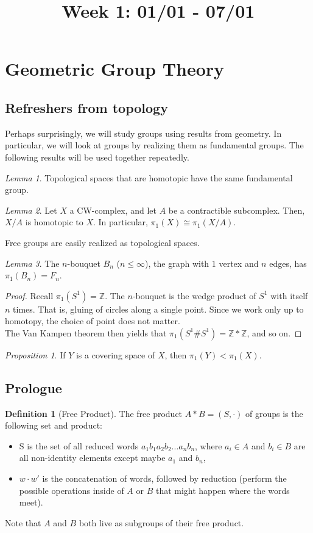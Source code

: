 \documentclass[11pt]{article}
\title{Week 1: 01/01 - 07/01}
\date{}
\theoremstyle{definition}
\newtheorem{definition}{Definition}[section]
\theoremstyle{example}
\theoremstyle{remark}
\theoremstyle{lemma}
\newtheorem{lemma}{Lemma}[section]
\theoremstyle{proposition}
\newtheorem{proposition}{Proposition}[section]
\theoremstyle{Problem}
\theoremstyle{Solution}
\theoremstyle{theorem}
\begin{document}
\maketitle



\section{Geometric Group Theory}
\subsection{Refreshers from topology}
Perhaps surprisingly, we will study groups using results from geometry. In particular, we will look at groups by realizing them as fundamental groups. The following results will be used together repeatedly.
\begin{lemma}
Topological spaces that are homotopic have the same fundamental group. 
\end{lemma}
\begin{lemma}
Let $X$ a CW-complex, and let $A$ be a contractible subcomplex. Then, $X/A$ is homotopic to $X$. In particular, $\pi_1(X) \cong \pi_1(X/A)$.
\end{lemma}

Free groups are easily realized as topological spaces.
\begin{lemma}
The $n$-bouquet $B_n$ ($n\leq \infty$), the graph with $1$ vertex and $n$ edges, has $\pi_1(B_n) = F_n$.
\end{lemma}
\begin{proof}
Recall $\pi_1(S^1)=\mathbb{Z}$. The $n$-bouquet is the wedge product of $S^1$ with itself $n$ times. That is, gluing of circles along a single point. Since we work only up to homotopy, the choice of point does not matter.\\
The Van Kampen theorem then yields that $\pi_1(S^1\# S^1) = \mathbb{Z}*\mathbb{Z}$, and so on.
\end{proof}

\begin{proposition}
If $Y$ is a covering space of $X$, then $\pi_1(Y) < \pi_1(X)$.
\end{proposition}

\subsection{Prologue}
\begin{definition}[Free Product]
The free product $A*B = (S, \cdot)$ of groups is the following set and product:
\begin{itemize}
\item S is the set of all reduced words $a_1b_1a_2b_2...a_nb_n$, where $a_i\in A$ and $b_i\in B$ are all non-identity elements except maybe $a_1$ and $b_n$,
\item $w\cdot w'$ is the concatenation of words, followed by reduction (perform the possible operations inside of $A$ or $B$ that might happen where the words meet).
\end{itemize}
Note that $A$ and $B$ both live as subgroups of their free product.
\end{definition}
\end{document}
